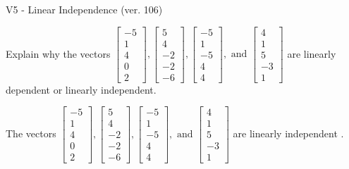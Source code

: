 \begin{exercise}
  \begin{exerciseTitle}V5 - Linear Independence (ver. 106)\end{exerciseTitle}
  \begin{exerciseStatement}
    Explain why the vectors \(\left[\begin{array}{r}
-5 \\
1 \\
4 \\
0 \\
2
\end{array}\right] , \left[\begin{array}{r}
5 \\
4 \\
-2 \\
-2 \\
-6
\end{array}\right] , \left[\begin{array}{r}
-5 \\
1 \\
-5 \\
4 \\
4
\end{array}\right] , \text{ and } \left[\begin{array}{r}
4 \\
1 \\
5 \\
-3 \\
1
\end{array}\right]\) are linearly dependent or linearly independent.	


  \end{exerciseStatement}
  \begin{exerciseAnswer}
   The vectors \(\left[\begin{array}{r}
-5 \\
1 \\
4 \\
0 \\
2
\end{array}\right] , \left[\begin{array}{r}
5 \\
4 \\
-2 \\
-2 \\
-6
\end{array}\right] , \left[\begin{array}{r}
-5 \\
1 \\
-5 \\
4 \\
4
\end{array}\right] , \text{ and } \left[\begin{array}{r}
4 \\
1 \\
5 \\
-3 \\
1
\end{array}\right]\) are 
  	 linearly independent  .
  


  \end{exerciseAnswer}
\end{exercise}